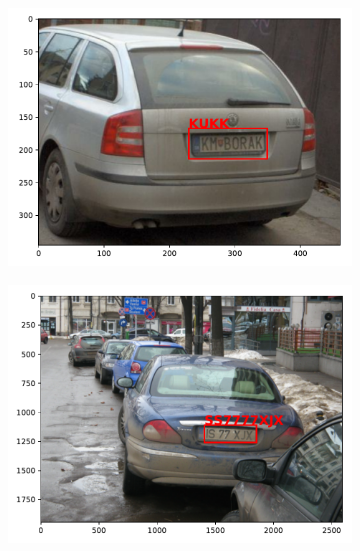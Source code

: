\begin{figure}
\begin{subfigure}{0.31\textwidth}
        \includegraphics[width=\textwidth]{abbildungen/prediction_07.pdf}
    \end{subfigure}
    \begin{subfigure}{0.31\textwidth}
        \includegraphics[width=\textwidth]{abbildungen/prediction_08.pdf}
    \end{subfigure}


\end{figure}
